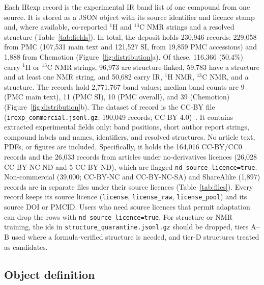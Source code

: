 \documentclass[pdflatex,sn-nature]{sn-jnl}
\begin{document}
Each IRexp record is the experimental IR band list of one compound from one source.
It is stored as a JSON object with its source identifier and licence stamp and, where
available, co-reported $^{1}$H and $^{13}$C NMR strings and a resolved structure
(Table~\ref{tab:fields}).
In total, the deposit holds 230,946 records: 229,058 from PMC (107,531 main text and
121,527 SI, from 19,859 PMC accessions) and 1,888 from Chemotion
(Figure~\ref{fig:distribution}a).
Of these, 116,366 (50.4\%) carry $^{1}$H or $^{13}$C NMR strings, 96,973 are
structure-linked, 59,783 have a structure and at least one NMR string, and 50,682 carry
IR, $^{1}$H NMR, $^{13}$C NMR, and a structure.
The records hold 2,771,767 band values; median band counts are 9 (PMC main text), 11
(PMC SI), 10 (PMC overall), and 39 (Chemotion) (Figure~\ref{fig:distribution}b).
The dataset of record is the CC-BY file (\texttt{irexp\_commercial.jsonl.gz}; 190,049
records; CC-BY-4.0)~\citep{hrynaszkiewicz2012open}.
It contains extracted experimental fields only: band positions, short author report
strings, compound labels and names, identifiers, and resolved structures.
No article text, PDFs, or figures are included.
Specifically, it holds the 164,016 CC-BY/CC0 records and the 26,033 records from articles under
no-derivatives licences (26,028 CC-BY-NC-ND and 5 CC-BY-ND), which are flagged
\texttt{nd\_source\_licence=true}.
Non-commercial (39,000; CC-BY-NC and CC-BY-NC-SA) and ShareAlike (1,897) records are in
separate files under their source licences (Table~\ref{tab:files}).
Every record keeps its source licence (\texttt{license}, \texttt{license\_raw},
\texttt{license\_pool}) and its source DOI or PMCID.
Users who need source licences that permit adaptation can drop the rows with
\texttt{nd\_source\_licence=true}.
For structure or NMR training, the ids in \texttt{structure\_quarantine.jsonl.gz} should be
dropped, tiers A--B used where a formula-verified structure is needed, and tier-D
structures treated as candidates.

\subsection{Object definition}\label{sec:objdef}
\end{document}
